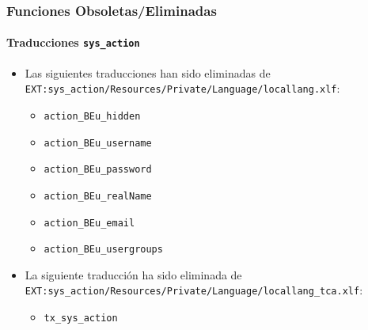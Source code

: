 \begin{frame}[fragile]
	\frametitle{Funciones Obsoletas/Eliminadas}
	\framesubtitle{Traducciones \texttt{sys\_action}}

	\begin{itemize}
		\item Las siguientes traducciones han sido eliminadas de
			\smaller\texttt{EXT:sys\_action/Resources/Private/Language/locallang.xlf}:\normalsize

		\begin{itemize}
			\item \texttt{action\_BEu\_hidden}
			\item \texttt{action\_BEu\_username}
			\item \texttt{action\_BEu\_password}
			\item \texttt{action\_BEu\_realName}
			\item \texttt{action\_BEu\_email}
			\item \texttt{action\_BEu\_usergroups}
		\end{itemize}

		\item La siguiente traducción ha sido eliminada de
			\smaller\texttt{EXT:sys\_action/Resources/Private/Language/locallang\_tca.xlf}:\normalsize

		\begin{itemize}
			\item \texttt{tx\_sys\_action}
		\end{itemize}

	\end{itemize}

\end{frame}



